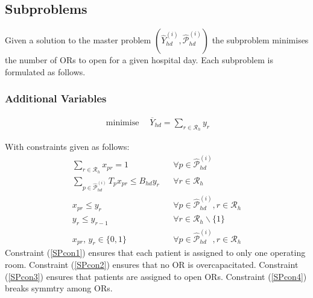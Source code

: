\subsection{Subproblems}
Given a solution to the master problem $(\widehat{Y}^{(i)}_{hd}, \widehat{\mathcal{P}}^{(i)}_{hd})$ the 
subproblem minimises the number of ORs to open for a given hospital day. Each subproblem is
formulated as follows. 
\subsubsection*{Additional Variables}
\leavevmode
\newline
\begin{table}[H]
\end{table}
\begin{align}
    \operatorname*{minimise} \quad \overline{Y}_{hd} = \sum\limits_{r \in \mathcal{R}_h}y_r
\end{align}

With constraints given as follows:
\begin{align}
    \sum\limits_{r\in\mathcal{R}_h}x_{pr} = 1 && \forall p \in \widehat{\mathcal{P}}^{(i)}_{hd}\label{SPcon1}\\
    \sum\limits_{p \in \widehat{\mathcal{P}}^{(i)}_{hd}} T_px_{pr} \leq B_{hd}y_r 
    && \forall r \in \mathcal{R}_h \label{SPcon2}\\
    x_{pr} \leq y_r && \forall p \in \widehat{\mathcal{P}}^{(i)}_{hd}, r \in \mathcal{R}_h \label{SPcon3}\\
    y_r \leq y_{r-1} && \forall r \in \mathcal{R}_h \backslash \{1\}\label{SPcon4}\\
    x_{pr},\,y_r\in\{0,1\} && \forall p \in \widehat{\mathcal{P}}^{(i)}_{hd}, r \in \mathcal{R}_h\label{SPcon5}
\end{align}
Constraint (\ref*{SPcon1}) ensures that each patient is assigned to only one operating room.
Constraint (\ref*{SPcon2}) ensures that no OR is overcapacitated. Constraint (\ref*{SPcon3})
ensures that patients are assigned to open ORs. Constraint (\ref*{SPcon4}) breaks symmtry
among ORs.